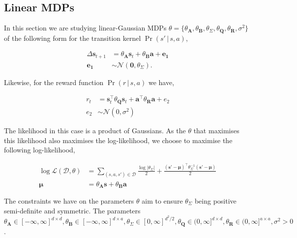 \subsection{Linear MDPs}

In this section we are studying linear-Gaussian MDPs $\theta = \{\theta_{\mathbf{A}}, \theta_{\mathbf{B}}, \theta_{\Sigma}, \theta_{\mathbf{Q}}, \theta_{\mathbf{R}}, \sigma^2\}$ of the following form for the transition kernel $\Pr(s' \, | \, s, a)$,

\begin{align*}
    \Delta \bm{s}_{t+1} &= \theta_{\mathbf{A}}\bm{s}_t + \theta_{\mathbf{B}}\bm{a}+ \bm{e_1}\\ 
    \bm{e_1} &\sim \mathcal{N}(\bm{0}, \theta_{\Sigma}).
\end{align*}

Likewise, for the reward function $\Pr(r \, | \, s,a)$ we have,

\begin{align*}
    r_t &= \bm{s}_t^\top\theta_{\mathbf{Q}}\bm{s}_t + \bm{a}^\top \theta_{\mathbf{R}}\bm{a} + e_2\\
    e_2 &\sim \mathcal{N}(0, \sigma^2)
\end{align*}

The likelihood in this case is a product of Gaussians. As the $\theta$ that maximises this likelihood also maximises the log-likelihood, we choose to maximise the following log-likelihood, 

\begin{align}
    \log \mathcal{L}(\mathcal{D}, \theta) &= \sum_{(s, a, s') \in \mathcal{D}} \frac{\log |\theta_\Sigma|}{2} + \frac{(\bm{s}'-\bm{\mu})^\top \theta_\Sigma^{-1}(\bm{s}'-\bm{\mu})}{2}\\
    \bm{\mu} &= \theta_{\mathbf{A}}\bm{s}+\theta_{\mathbf{B}}\bm{a}
\end{align}

The constraints we have on the parameters $\theta$ aim to ensure $\theta_\Sigma$ being positive semi-definite and symmetric. The parameters $\theta_{\mathbf{A}} \in [-\infty, \infty]^{d \times d}, \theta_{\mathbf{B}} \in [-\infty, \infty]^{d \times a}, \theta_{\Sigma} \in [0, \infty]^{d^2/2}, \theta_{\mathbf{Q}}\in (0, \infty]^{d\times d}, \theta_{\mathbf{R}}\in (0, \infty]^{a \times a}, \sigma^2 > 0$.

